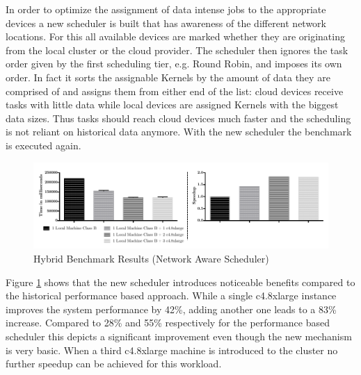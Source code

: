 In order to optimize the assignment of data intense jobs to the appropriate devices a new scheduler is built that has awareness of the different network locations. For this all available devices are marked whether they are originating from the local cluster or the cloud provider. The scheduler then ignores the task order given by the first scheduling tier, e.g. Round Robin, and imposes its own order. In fact it sorts the assignable Kernels by the amount of data they are comprised of and assigns them from either end of the list: cloud devices receive tasks with little data while local devices are assigned Kernels with the biggest data sizes. Thus tasks should reach cloud devices much faster and the scheduling is not reliant on historical data anymore. With the new scheduler the benchmark is executed again.

\begin{figure}[H]	
	\includegraphics[width=1.0\textwidth]{images/hybrid_full_benchmark_network_based.pdf}
	\centering
	\caption{Hybrid Benchmark Results (Network Aware Scheduler)}
	\label{img:hybrid_benchmark_results_network_aware}
\end{figure}

Figure \ref{img:hybrid_benchmark_results_network_aware} shows that the new scheduler introduces noticeable benefits compared to the historical performance based approach. While a single c4.8xlarge instance improves the system performance by 42\%, adding another one leads to a 83\% increase. Compared to 28\% and 55\% respectively for the performance based scheduler this depicts a significant improvement even though the new mechanism is very basic. When a third c4.8xlarge machine is introduced to the cluster no further speedup can be achieved for this workload.

